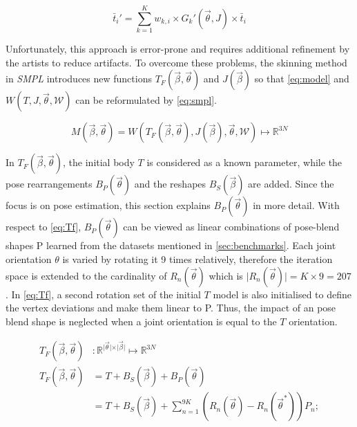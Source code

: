 \begin{equation}
\label{eq:lbs}
\bar{t}_{i}' = \sum_{k=1}^{K} w_{k,i} \times G_{k}'(\vec{\theta},J) \times \bar{t}_{i}
\end{equation}

Unfortunately, this approach is error-prone and requires additional refinement by the artists to reduce artifacts. To overcome these problems, the skinning method in \emph{SMPL} introduces new functions $T_{F}(\vec{\beta},\vec{\theta})$ and $J(\vec{\beta})$ so that \autoref{eq:model} and $W(T,J,\vec{\theta},\mathcal{W})$ can be reformulated by \autoref{eq:smpl}.

\begin{equation}
\label{eq:smpl}
M(\vec{\beta},\vec{\theta}) = W(T_{F}(\vec{\beta},\vec{\theta}),J(\vec{\beta}),\vec{\theta},\mathcal{W}) \mapsto \mathbb{R}^{3N}
\end{equation}

In $T_{F}(\vec{\beta},\vec{\theta})$, the initial body $T$ is considered as a known parameter, while the pose rearrangements $B_{P}(\vec{\theta})$ and the reshapes $B_{S}(\vec{\beta})$ are added. Since the focus is on pose estimation, this section explains $B_{P}(\vec{\theta})$ in more detail. With respect to \autoref{eq:Tf}, $B_{P}(\vec{\theta})$ can be viewed as linear combinations of pose-blend shapes P learned from the datasets mentioned in \autoref{sec:benchmarks}. Each joint orientation $\theta$ is varied by rotating it 9 times relatively, therefore the iteration space is extended to the cardinality of $R_{n}(\vec{\theta})$ which is $\vert R_{n}(\vec{\theta}) \vert = K \times 9 = 207$. In \autoref{eq:Tf}, a second rotation set of the initial $T$ model is also initialised to define the vertex deviations and make them linear to P. Thus, the impact of an pose blend shape is neglected when a joint orientation is equal to the $T$ orientation.

\begin{equation}
\label{eq:Tf}
	\begin{split}
		T_{F}(\vec{\beta},\vec{\theta})&: \mathbb{R}^{\vert \vec{\theta} 			\vert \times \vert \vec{\beta} \vert} \mapsto \mathbb{R}^{3N} \\
		T_{F}(\vec{\beta},\vec{\theta}) &= T + B_{S}(\vec{\beta}) + B_{P}				(\vec{\theta}) \\
		&= T + B_{S}(\vec{\beta}) + \sum_{n=1}^{9K} (R_{n}(\vec{\theta}) - 				R_{n}(\vec{\theta}^{*}))P_{n};
	\end{split}
\end{equation}


